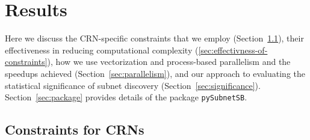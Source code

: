 \documentclass[webpdf,contemporary,large]{oup-authoring-template}
\newcommand{\secref}[1]{Section~\ref{#1}}
\newcommand{\py}{\texttt{pySubnetSB}}
\theoremstyle{thmstyleone}%
\theoremstyle{thmstyletwo}%
\theoremstyle{thmstylethree}%
\begin{document}
\section{Results}\label{sec:results}
Here we discuss the CRN-specific constraints that
we employ (\secref{sec:constraints}), their effectiveness in reducing computational complexity (\ref{sec:effectivness-of-constraints}), how we use vectorization and process-based
parallelism and the speedups achieved (\secref{sec:parallelism}), and our approach to evaluating the statistical
significance of subnet discovery (\secref{sec:significance}).
\secref{sec:package} provides details of the package \py{}.


\subsection{Constraints for CRNs}\label{sec:constraints}
\end{document}
